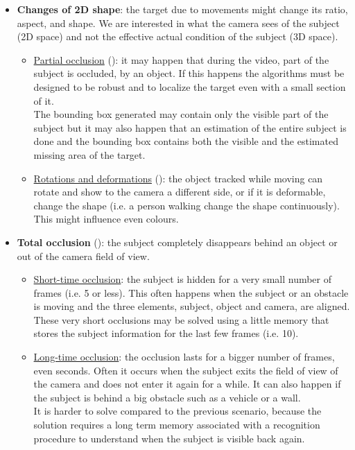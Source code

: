 \begin{itemize}
	\item \textbf{Changes of 2D shape}: the target due to movements might change its ratio, aspect, and shape. We are interested in what the camera sees of the subject (2D  space) and not the effective actual condition of the subject (3D space).
	\begin{itemize}
		\item \underline{Partial occlusion} (): it may happen that during the video, part of the subject is occluded, by an object. If this happens the algorithms must be designed to be robust and to localize the target even with a small section of it.\\
		The bounding box generated may contain only the visible part of the subject but it may also happen that an estimation of the entire subject is done and the bounding box contains both the visible and the estimated missing area of the target.
		\item \underline{Rotations and deformations} (): the object tracked while moving can rotate and show to the camera a different side, or if it is deformable, change the shape (i.e. a person walking change the shape continuously). This might influence even colours.
	\end{itemize}
	
	\item \textbf{Total occlusion} (): the subject completely disappears behind an object or out of the camera field of view.
	\begin{itemize}
		\item \underline{Short-time occlusion}: the subject is hidden for a very small number of frames (i.e. 5 or less). This often happens when the subject or an obstacle is moving and the three elements, subject, object and camera, are aligned. These very short occlusions may be solved using a little memory that stores the subject information for the last few frames (i.e. 10).
		\item \underline{Long-time  occlusion}: the occlusion lasts for a bigger number of frames, even seconds. Often it occurs when the subject exits the field of view of the camera and does not enter it again for a while. It can also happen if the subject is behind a big obstacle such as a vehicle or a wall.\\
		It is harder to solve compared to the previous scenario, because the solution requires a long term memory associated with a recognition procedure to understand when the subject is visible back again.
	\end{itemize}


\end{itemize}
